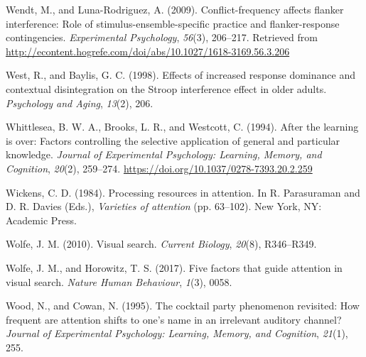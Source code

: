\documentclass[]{DissertateCUNY}
\begin{document}
\leavevmode\hypertarget{ref-wendt_conflict-frequency_2009}{}%
Wendt, M., and Luna-Rodriguez, A. (2009). Conflict-frequency affects
flanker interference: Role of stimulus-ensemble-specific practice and
flanker-response contingencies. \emph{Experimental Psychology},
\emph{56}(3), 206--217. Retrieved from
\url{http://econtent.hogrefe.com/doi/abs/10.1027/1618-3169.56.3.206}

\leavevmode\hypertarget{ref-west_effects_1998}{}%
West, R., and Baylis, G. C. (1998). Effects of increased response
dominance and contextual disintegration on the Stroop interference
effect in older adults. \emph{Psychology and Aging}, \emph{13}(2), 206.

\leavevmode\hypertarget{ref-whittlesea_after_1994}{}%
Whittlesea, B. W. A., Brooks, L. R., and Westcott, C. (1994). After the
learning is over: Factors controlling the selective application of
general and particular knowledge. \emph{Journal of Experimental
Psychology: Learning, Memory, and Cognition}, \emph{20}(2), 259--274.
\url{https://doi.org/10.1037/0278-7393.20.2.259}

\leavevmode\hypertarget{ref-wickens_processing_1984}{}%
Wickens, C. D. (1984). Processing resources in attention. In R.
Parasuraman and D. R. Davies (Eds.), \emph{Varieties of attention} (pp.
63--102). New York, NY: Academic Press.

\leavevmode\hypertarget{ref-wolfe_visual_2010}{}%
Wolfe, J. M. (2010). Visual search. \emph{Current Biology},
\emph{20}(8), R346--R349.

\leavevmode\hypertarget{ref-wolfe_five_2017}{}%
Wolfe, J. M., and Horowitz, T. S. (2017). Five factors that guide
attention in visual search. \emph{Nature Human Behaviour}, \emph{1}(3),
0058.

\leavevmode\hypertarget{ref-wood_cocktail_1995}{}%
Wood, N., and Cowan, N. (1995). The cocktail party phenomenon revisited:
How frequent are attention shifts to one's name in an irrelevant
auditory channel? \emph{Journal of Experimental Psychology: Learning,
Memory, and Cognition}, \emph{21}(1), 255.

\clearpage
\end{document}
